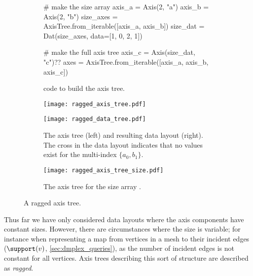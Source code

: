 \documentclass[thesis]{subfiles}
\begin{document}
\begin{figure}
  \centering
  \begin{subfigure}{.9\textwidth}
    \begin{pyalg2}
      # make the size array
      axis_a = Axis(2, "a")
      axis_b = Axis(2, "b")
      size_axes = AxisTree.from_iterable([axis_a, axis_b])
      size_dat = Dat(size_axes, data=[1, 0, 2, 1])

      # make the full axis tree
      axis_c = Axis(size_dat, "c")?\label{code:ragged_size_dat}?
      axes = AxisTree.from_iterable([axis_a, axis_b, axis_c])
    \end{pyalg2}
    \caption{ code to build the axis tree.}
  \end{subfigure}

  \vspace{1em}

  \begin{subfigure}{\textwidth}
    \centering
    \begin{minipage}{.4\textwidth}
      \begin{center}
        \texttt{[image: ragged\_axis\_tree.pdf]}
      \end{center}
    \end{minipage}
    \begin{minipage}{.58\textwidth}
      \begin{center}
        \texttt{[image: ragged\_data\_tree.pdf]}
      \end{center}
    \end{minipage}
    \caption{
      The axis tree (left) and resulting data layout (right).
      The cross in the data layout indicates that no values exist for the multi-index $\{a_0, b_1\}$.
    }
  \end{subfigure}

  \vspace{1em}

  \begin{subfigure}{\textwidth}
    \centering
    \texttt{[image: ragged\_axis\_tree\_size.pdf]}
    \caption{
      The axis tree for the size array \pycode{[[1,0],[2,1]][?$i_a$?,?$i_b$?]}.
    }

  \end{subfigure}

  \caption{
    A ragged axis tree.
  }
  \label{fig:ragged_axis_tree}
\end{figure}

Thus far we have only considered data layouts where the axis components have constant sizes.
However, there are circumstances where the size is variable; for instance when representing a map from vertices in a mesh to their incident edges ($\support(v)$, \cref{sec:dmplex_queries}), as the number of incident edges is not constant for all vertices.
Axis trees describing this sort of structure are described as \emph{ragged}.
\end{document}
